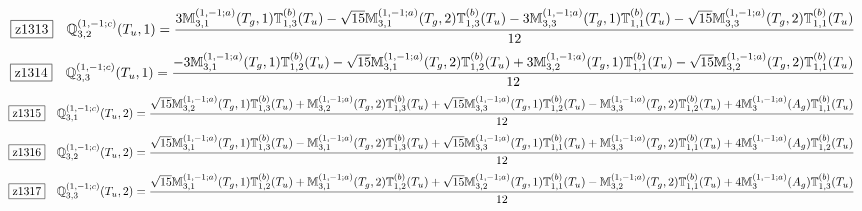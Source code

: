 \documentclass[fleqn,10pt,landscape]{jsarticle}
\begin{document}
\begin{dmath*}
\hspace*{3mm}\fbox{z1313}\quad \mathbb{Q}_{3,2}^{(1,-1;c)}(T_{u},1)=\frac{3 \mathbb{M}_{3,1}^{(1,-1;a)}(T_{g},1) \mathbb{T}_{1,3}^{(b)}(T_{u}) - \sqrt{15} \mathbb{M}_{3,1}^{(1,-1;a)}(T_{g},2) \mathbb{T}_{1,3}^{(b)}(T_{u}) - 3 \mathbb{M}_{3,3}^{(1,-1;a)}(T_{g},1) \mathbb{T}_{1,1}^{(b)}(T_{u}) - \sqrt{15} \mathbb{M}_{3,3}^{(1,-1;a)}(T_{g},2) \mathbb{T}_{1,1}^{(b)}(T_{u})}{12}
\end{dmath*}
\begin{dmath*}
\hspace*{3mm}\fbox{z1314}\quad \mathbb{Q}_{3,3}^{(1,-1;c)}(T_{u},1)=\frac{- 3 \mathbb{M}_{3,1}^{(1,-1;a)}(T_{g},1) \mathbb{T}_{1,2}^{(b)}(T_{u}) - \sqrt{15} \mathbb{M}_{3,1}^{(1,-1;a)}(T_{g},2) \mathbb{T}_{1,2}^{(b)}(T_{u}) + 3 \mathbb{M}_{3,2}^{(1,-1;a)}(T_{g},1) \mathbb{T}_{1,1}^{(b)}(T_{u}) - \sqrt{15} \mathbb{M}_{3,2}^{(1,-1;a)}(T_{g},2) \mathbb{T}_{1,1}^{(b)}(T_{u})}{12}
\end{dmath*}
\begin{dmath*}
\hspace*{3mm}\fbox{z1315}\quad \mathbb{Q}_{3,1}^{(1,-1;c)}(T_{u},2)=\frac{\sqrt{15} \mathbb{M}_{3,2}^{(1,-1;a)}(T_{g},1) \mathbb{T}_{1,3}^{(b)}(T_{u}) + \mathbb{M}_{3,2}^{(1,-1;a)}(T_{g},2) \mathbb{T}_{1,3}^{(b)}(T_{u}) + \sqrt{15} \mathbb{M}_{3,3}^{(1,-1;a)}(T_{g},1) \mathbb{T}_{1,2}^{(b)}(T_{u}) - \mathbb{M}_{3,3}^{(1,-1;a)}(T_{g},2) \mathbb{T}_{1,2}^{(b)}(T_{u}) + 4 \mathbb{M}_{3}^{(1,-1;a)}(A_{g}) \mathbb{T}_{1,1}^{(b)}(T_{u})}{12}
\end{dmath*}
\begin{dmath*}
\hspace*{3mm}\fbox{z1316}\quad \mathbb{Q}_{3,2}^{(1,-1;c)}(T_{u},2)=\frac{\sqrt{15} \mathbb{M}_{3,1}^{(1,-1;a)}(T_{g},1) \mathbb{T}_{1,3}^{(b)}(T_{u}) - \mathbb{M}_{3,1}^{(1,-1;a)}(T_{g},2) \mathbb{T}_{1,3}^{(b)}(T_{u}) + \sqrt{15} \mathbb{M}_{3,3}^{(1,-1;a)}(T_{g},1) \mathbb{T}_{1,1}^{(b)}(T_{u}) + \mathbb{M}_{3,3}^{(1,-1;a)}(T_{g},2) \mathbb{T}_{1,1}^{(b)}(T_{u}) + 4 \mathbb{M}_{3}^{(1,-1;a)}(A_{g}) \mathbb{T}_{1,2}^{(b)}(T_{u})}{12}
\end{dmath*}
\begin{dmath*}
\hspace*{3mm}\fbox{z1317}\quad \mathbb{Q}_{3,3}^{(1,-1;c)}(T_{u},2)=\frac{\sqrt{15} \mathbb{M}_{3,1}^{(1,-1;a)}(T_{g},1) \mathbb{T}_{1,2}^{(b)}(T_{u}) + \mathbb{M}_{3,1}^{(1,-1;a)}(T_{g},2) \mathbb{T}_{1,2}^{(b)}(T_{u}) + \sqrt{15} \mathbb{M}_{3,2}^{(1,-1;a)}(T_{g},1) \mathbb{T}_{1,1}^{(b)}(T_{u}) - \mathbb{M}_{3,2}^{(1,-1;a)}(T_{g},2) \mathbb{T}_{1,1}^{(b)}(T_{u}) + 4 \mathbb{M}_{3}^{(1,-1;a)}(A_{g}) \mathbb{T}_{1,3}^{(b)}(T_{u})}{12}
\end{dmath*}
\end{document}
